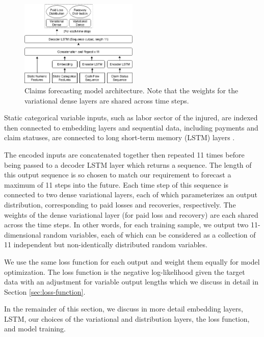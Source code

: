 \documentclass{article}
\begin{document}
\begin{figure}
  \begin{center}
    \includegraphics[width=0.5\textwidth]{images/architecture.png}
  \end{center}
  \caption{Claims forecasting model architecture. Note that the weights for the 
  variational dense layers are shared across time steps.}
  \label{fig:architecture}
\end{figure}

Static categorical variable inputs, such as labor sector of the injured, are 
indexed then connected to embedding layers \cite{guoEntityEmbeddings2016} and 
sequential data, including payments and claim statuses, are connected to long 
short-term memory (LSTM) layers \cite{hochreiterLongShortterm1997}.

The encoded inputs are concatenated together then repeated 11 times before being
passed to a decoder LSTM layer which returns a sequence. The length of this 
output sequence is so chosen to match our requirement to forecast a maximum of 
11 steps into the future. Each time step of this sequence is connected to two 
dense variational layers, each of which parameterizes an output distribution, 
corresponding to paid losses and recoveries, respectively. The weights of the 
dense variational layer (for paid loss and recovery) are each shared across the
time steps. In other words, for each training sample, we output two 
11-dimensional random variables, each of which can be considered as a collection
of 11 independent but non-identically distributed random variables.

We use the same loss function for each output and weight them equally for model
optimization. The loss function is the negative log-likelihood given the target 
data with an adjustment for variable output lengths which we discuss in detail 
in Section \ref{sec:loss-function}.

In the remainder of this section, we discuss in more detail embedding layers, 
LSTM, our choices of the variational and distribution layers, the loss function,
and model training.
\end{document}
